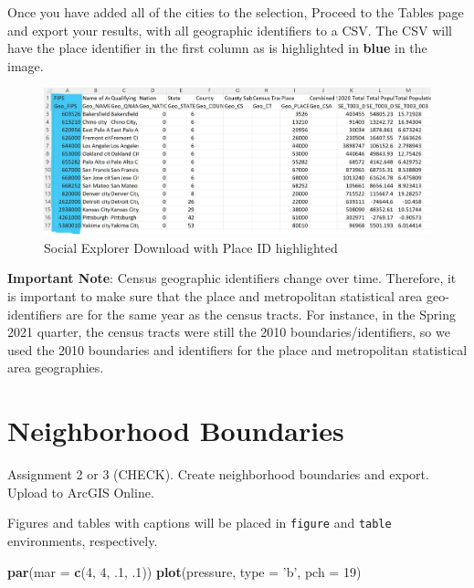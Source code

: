\documentclass[
]{book}
\newenvironment{Shaded}{\begin{snugshade}}{\end{snugshade}}
\newcommand{\DataTypeTok}[1]{\textcolor[rgb]{0.13,0.29,0.53}{#1}}
\newcommand{\DecValTok}[1]{\textcolor[rgb]{0.00,0.00,0.81}{#1}}
\newcommand{\FloatTok}[1]{\textcolor[rgb]{0.00,0.00,0.81}{#1}}
\newcommand{\KeywordTok}[1]{\textcolor[rgb]{0.13,0.29,0.53}{\textbf{#1}}}
\newcommand{\NormalTok}[1]{#1}
\newcommand{\StringTok}[1]{\textcolor[rgb]{0.31,0.60,0.02}{#1}}
\begin{document}
Once you have added all of the cities to the selection, Proceed to the Tables page and export your results, with all geographic identifiers to a CSV. The CSV will have the place identifier in the first column as is highlighted in {\textbf{blue}} in the image.

\begin{figure}
\centering
\includegraphics{images/Social Explorer Download Place FIPS.jpg}
\caption{Social Explorer Download with Place ID highlighted}
\end{figure}

\textbf{Important Note}: Census geographic identifiers change over time. Therefore, it is important to make sure that the place and metropolitan statistical area geo-identifiers are for the same year as the census tracts. For instance, in the Spring 2021 quarter, the census tracts were still the 2010 boundaries/identifiers, so we used the 2010 boundaries and identifiers for the place and metropolitan statistical area geographies.

\hypertarget{nhood}{%
\chapter{Neighborhood Boundaries}\label{nhood}}

Assignment 2 or 3 (CHECK). Create neighborhood boundaries and export. Upload to ArcGIS Online.

Figures and tables with captions will be placed in \texttt{figure} and \texttt{table} environments, respectively.

\begin{Shaded}
\begin{Highlighting}[]
\KeywordTok{par}\NormalTok{(}\DataTypeTok{mar =} \KeywordTok{c}\NormalTok{(}\DecValTok{4}\NormalTok{, }\DecValTok{4}\NormalTok{, }\FloatTok{.1}\NormalTok{, }\FloatTok{.1}\NormalTok{))}
\KeywordTok{plot}\NormalTok{(pressure, }\DataTypeTok{type =} \StringTok{'b'}\NormalTok{, }\DataTypeTok{pch =} \DecValTok{19}\NormalTok{)}
\end{Highlighting}
\end{Shaded}
\end{document}
